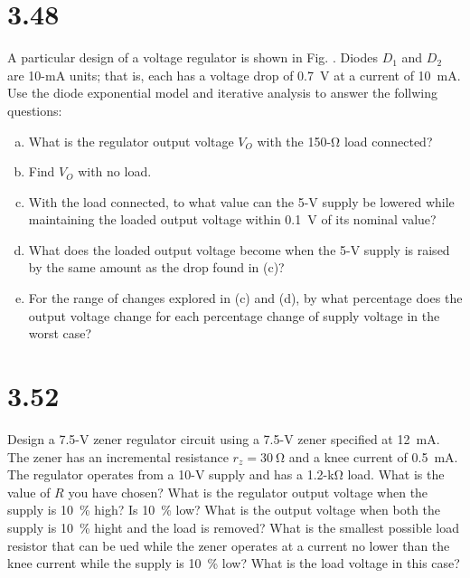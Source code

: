 \documentclass[12pt, a4paper]{article}
\newcommand{\sima}{\milli\ampere}
\newcommand{\siko}{\kilo\ohm}
\newcommand{\siv}{\volt}
\theoremstyle{mystyle}	%
\begin{document}
\section{3.48}
A particular design of a voltage regulator is shown in Fig. .
Diodes $D_1$ and $D_2$ are 10-\si{\sima} units; that is,
each has a voltage drop of \SI{0.7}{\siv} at a current of
\SI{10}{\sima}. Use the diode exponential model and iterative
analysis to answer the follwing questions:
\begin{enumerate}[(a)]
  \item What is the regulator output voltage $V_O$ with the
    150-\si{\ohm} load connected?
  \item Find $V_O$ with no load.
  \item With the load connected, to what value can the 5-\si{\siv}
    supply be lowered while maintaining the loaded output voltage
    within \SI{0.1}{\siv} of its nominal value?
  \item What does the loaded output voltage become when the 5-\si{\siv}
    supply is raised by the same amount as the drop found in (c)?
  \item For the range of changes explored in (c) and (d), by what
    percentage does the output voltage change for each percentage
    change of supply voltage in the worst case?
\end{enumerate}

\section{3.52}
Design a 7.5-\si{\siv} zener regulator circuit using a 7.5-\si{\siv}
zener specified at \SI{12}{\sima}. The zener has an incremental
resistance $r_z = \SI{30}{\ohm}$ and a knee current of \SI{0.5}{\sima}.
The regulator operates from a 10-\si{\siv} supply and has a
1.2-\si{\siko} load. What is the value of $R$ you have chosen?
What is the regulator output voltage when the supply is \SI{10}{\percent}
high? Is \SI{10}{\percent} low? What is the output voltage when both the
supply is \SI{10}{\percent} hight and the load is removed? What is
the smallest possible load resistor that can be ued while the zener
operates at a current no lower than the knee current while the supply
is \SI{10}{\percent} low? What is the load voltage in this case?

\end{document}
